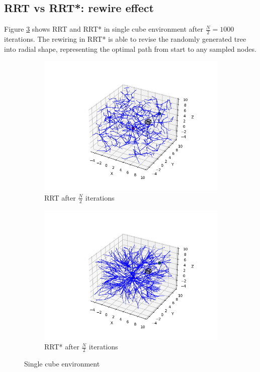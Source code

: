 \documentclass[conference]{IEEEtran}
\begin{document}
\subsection{RRT vs RRT*: rewire effect}
Figure \ref{fig:sc} shows RRT and RRT* in single cube environment
after $\frac{N}{2} = 1000$ iterations.
The rewiring in RRT* is able to revise the randomly generated 
tree into radial shape, representing the optimal path from start to any sampled nodes.

\begin{figure}[htbp]
    \centering
    \begin{subfigure}[b]{0.45\linewidth}
        \centering
        \includegraphics[width=\linewidth]{img/sc-RRT.png}
        \caption{RRT after $\frac{N}{2}$ iterations}
        \label{fig:sc-RRT}
    \end{subfigure}
    \begin{subfigure}[b]{0.45\linewidth}
        \centering
        \includegraphics[width=\linewidth]{img/sc-RRT*.png}
        \caption{RRT* after $\frac{N}{2}$ iterations}
        \label{fig:sc-RRT*}
    \end{subfigure}
    \caption{Single cube environment}
    \label{fig:sc}
\end{figure}
\end{document}
